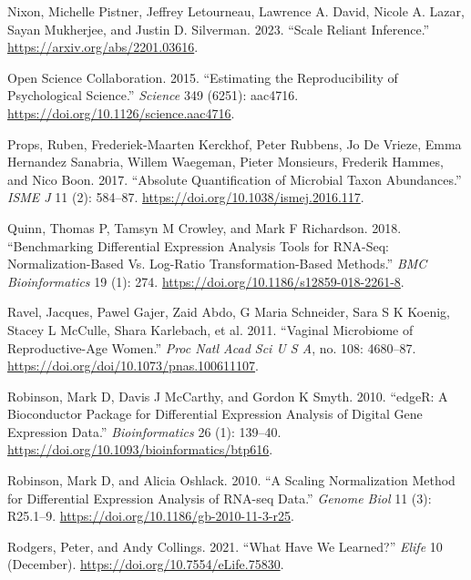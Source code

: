 \documentclass[
]{article}
\newlength{\cslhangindent}
\newlength{\cslentryspacingunit} %
\newenvironment{CSLReferences}[2] %
 {%
  \setlength{\parindent}{0pt}
  \ifodd #1
  \let\oldpar\par
  \def\par{\hangindent=\cslhangindent\oldpar}
  \fi
  \setlength{\parskip}{#2\cslentryspacingunit}
 }%
 {}
\begin{document}
\begin{CSLReferences}{1}{0}
\leavevmode{}%
Nixon, Michelle Pistner, Jeffrey Letourneau, Lawrence A. David, Nicole
A. Lazar, Sayan Mukherjee, and Justin D. Silverman. 2023. {``Scale
Reliant Inference.''} \url{https://arxiv.org/abs/2201.03616}.

\leavevmode{}%
Open Science Collaboration. 2015. {``Estimating the Reproducibility of
Psychological Science.''} \emph{Science} 349 (6251): aac4716.
\url{https://doi.org/10.1126/science.aac4716}.

\leavevmode{}%
Props, Ruben, Frederiek-Maarten Kerckhof, Peter Rubbens, Jo De Vrieze,
Emma Hernandez Sanabria, Willem Waegeman, Pieter Monsieurs, Frederik
Hammes, and Nico Boon. 2017. {``Absolute Quantification of Microbial
Taxon Abundances.''} \emph{ISME J} 11 (2): 584--87.
\url{https://doi.org/10.1038/ismej.2016.117}.

\leavevmode{}%
Quinn, Thomas P, Tamsyn M Crowley, and Mark F Richardson. 2018.
{``Benchmarking Differential Expression Analysis Tools for RNA-Seq:
Normalization-Based Vs. Log-Ratio Transformation-Based Methods.''}
\emph{BMC Bioinformatics} 19 (1): 274.
\url{https://doi.org/10.1186/s12859-018-2261-8}.

\leavevmode{}%
Ravel, Jacques, Pawel Gajer, Zaid Abdo, G Maria Schneider, Sara S K
Koenig, Stacey L McCulle, Shara Karlebach, et al. 2011. {``Vaginal
Microbiome of Reproductive-Age Women.''} \emph{Proc Natl Acad Sci U S
A}, no. 108: 4680--87. \url{https://doi.org/doi/10.1073/pnas.100611107}.

\leavevmode{}%
Robinson, Mark D, Davis J McCarthy, and Gordon K Smyth. 2010. {``edgeR:
A Bioconductor Package for Differential Expression Analysis of Digital
Gene Expression Data.''} \emph{Bioinformatics} 26 (1): 139--40.
\url{https://doi.org/10.1093/bioinformatics/btp616}.

\leavevmode{}%
Robinson, Mark D, and Alicia Oshlack. 2010. {``A Scaling Normalization
Method for Differential Expression Analysis of {RNA-seq} Data.''}
\emph{Genome Biol} 11 (3): R25.1--9.
\url{https://doi.org/10.1186/gb-2010-11-3-r25}.

\leavevmode{}%
Rodgers, Peter, and Andy Collings. 2021. {``What Have We Learned?''}
\emph{Elife} 10 (December). \url{https://doi.org/10.7554/eLife.75830}.


\end{CSLReferences}
\end{document}
